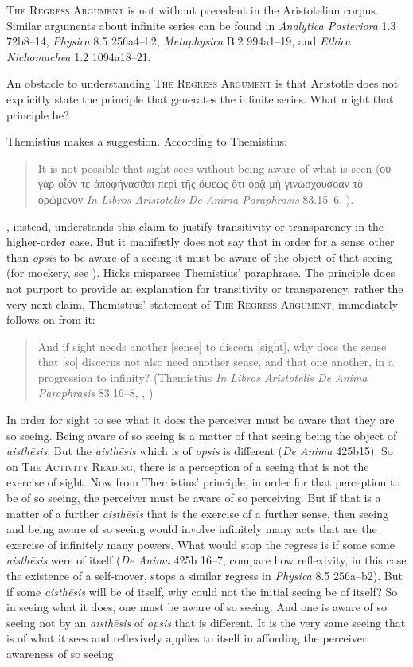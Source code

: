 \textsc{The Regress Argument} is not without precedent in the Aristotelian corpus. Similar arguments about infinite series can be found in \emph{Analytica Posteriora} 1.3 72b8–14, \emph{Physica} 8.5 256a4–b2, \emph{Metaphysica} B.2 994a1–19, and \emph{Ethica Nichomachea} 1.2 1094a18–21.

An obstacle to understanding \textsc{The Regress Argument} is that Aristotle does not explicitly state the principle that generates the infinite series. What might that principle be?

Themistius makes a suggestion. According to Themistius: 
\begin{quote}
	It is not possible that sight sees without being aware of what is seen ({\sbl οὐ γὰρ οἷόν τε ἀποφήνασϑαι περὶ τῆς ὄψεως ὅτι ὁρᾷ μὴ γινώσχουσοαν τὸ ὁρώμενον} \emph{In Libros Aristotelis De Anima Paraphrasis} 83.15–6, \citealt{Heinze:1899aa}).
\end{quote}
\citet[435]{Hicks:1907uq}, instead, understands this claim to justify transitivity or transparency in the higher-order case. But it manifestly does not say that in order for a sense other than \emph{opsis} to be aware of a seeing it must be aware of the object of that seeing (for mockery, see \citealt[44–5]{Kosman:2014ab}). Hicks misparses Themistius' paraphrase. The principle does not purport to provide an explanation for transitivity or transparency, rather the very next claim, Themistius' statement of \textsc{The Regress Argument}, immediately follows on from it:
\begin{quote}
	And if sight needs another [sense] to discern [sight], why does the sense that [so] discerns not also need another sense, and that one another, in a progression to infinity? (Themistius \emph{In Libros Aristotelis De Anima Paraphrasis} 83.16–8, \citealt{Heinze:1899aa}, \citealt[105]{Todd:1996aa})
\end{quote}

In order for sight to see what it does the perceiver must be aware that they are so seeing. Being aware of so seeing is a matter of that seeing being the object of \emph{aisthēsis}. But the \emph{aisthēsis} which is of \emph{opsis} is different (\emph{De Anima} 425b15). So on \textsc{The Activity Reading}, there is a perception of a seeing that is not the exercise of sight. Now from Themistius' principle, in order for that perception to be of so seeing, the perceiver must be aware of so perceiving. But if that is a matter of a further \emph{aisthēsis} that is the exercise of a further sense, then seeing and being aware of so seeing would involve infinitely many acts that are the exercise of infinitely many powers. What would stop the regress is if some some \emph{aisthēsis} were of itself (\emph{De Anima} 425b 16–7, compare how reflexivity, in this case the existence of a self-mover, stops a similar regress in \emph{Physica} 8.5 256a–b2). But if some \emph{aisthēsis} will be of itself, why could not the initial seeing be of itself? So in seeing what it does, one must be aware of so seeing. And one is aware of so seeing not by an \emph{aisthēsis} of \emph{opsis} that is different. It is the very same seeing that is of what it sees and reflexively applies to itself in affording the perceiver awareness of so seeing. 

